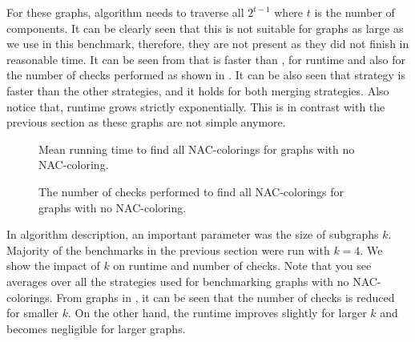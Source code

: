 For these graphs, \NaiveCycles{} algorithm needs to traverse all \( 2^{t-1} \)
where \( t \) is the number of \trcon{} components. It can be clearly seen that
this is not suitable for graphs as large as we use in this benchmark,
therefore, they are not present as they did not finish in reasonable time.
It can be seen from 
that \SharedVertices{} is faster than \MergeLinear{},
for runtime and also for the number of checks performed
as shown in .
%
It can be also seen that \NeighborsDegree{} strategy is
faster than the other strategies, and it holds for both merging strategies.
Also notice that,
runtime grows strictly exponentially.
This is in contrast with the previous section
as these graphs are not simple anymore.

\begin{figure}[p]
	\centering
	\scalebox{0.5}{}
	\caption[Mean runtime for graphs with no NAC-coloring.]{
		Mean running time to find all NAC-colorings for graphs with no NAC-coloring.}%
	\label{fig:graph_no_nac_coloring_first_runtime}
\end{figure}%
\begin{figure}[p]
	\centering
	\scalebox{0.5}{}
	\caption[Checks performed for graphs with no NAC-coloring.]{
		The number of checks performed to find all NAC-colorings for graphs with no NAC-coloring.}%
	\label{fig:graph_no_nac_coloring_first_checks}
\end{figure}%

In \Subgraphs{} algorithm description, an important parameter was the size of subgraphs \( k \).
Majority of the benchmarks in the previous section were run with \( k = 4 \).
%
We show the impact of	\( k \) on runtime and number of checks.
Note that you see averages over all the strategies used for benchmarking
graphs with no NAC-colorings.
%
From graphs in ,
it can be seen that the number of checks is reduced for smaller \( k \).
On the other hand, the runtime improves slightly for larger \( k \)
and becomes negligible for larger graphs.

